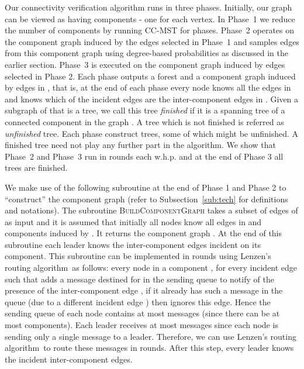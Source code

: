 \documentclass[11pt]{article}
\newcommand{\lra}{Lenzen's routing algorithm}
\begin{document}
Our connectivity verification algorithm runs in three phases. 
Initially, our graph can be viewed as having  components - one for each vertex. 
In Phase~1 we reduce the number of components by running \textsc{CC-MST} for  phases. 
Phase~2 operates on the component graph induced by the edges selected in Phase~1  and samples edges from this component graph using degree-based probabilities as discussed in the earlier section. 
Phase~3 is executed on the component graph induced by edges selected in Phase 2. 
Each phase outputs a forest  and a component graph  induced by edges in , that is, 
at the end of each phase every node knows all the edges in  and knows which of the incident edges are the inter-component edges in .  
Given a subgraph of  that is a tree, we call this tree \textit{finished} if it is a spanning tree of a connected component in the graph .
A tree which is not finished is referred as \textit{unfinished} tree. 
Each phase construct trees, some of which might be unfinished. 
A finished tree need not play any further part in the algorithm.
We show that Phase~2 and Phase~3 run in  rounds each w.h.p. and 
at the end of Phase 3 all trees are finished. 

We make use of the following subroutine at the end of Phase 1 and Phase 2 to ``construct'' the component graph 
(refer to Subsection~\ref{sub:tech} for definitions and notations). 
The subroutine \textsc{BuildComponentGraph} takes a subset of edges of  as input and it is assumed that initially all nodes know all edges in  and components induced by .  
It returns the component graph . 
At the end of this subroutine each leader knows the inter-component edges incident on its component. 
This subroutine can be implemented in  rounds using \lra~as follows:
every node  in a component , for every incident edge  such that  adds a message destined for  in the sending queue to notify  of the presence of the inter-component edge , if it already has such a message in the queue (due to a different incident edge ) then  ignores this edge.
Hence the sending queue of each node contains at most  messages (since there can be at most  components). 
Each leader receives at most  messages since each node is sending only a single message to a leader.
Therefore, we can use \lra~to route these messages in  rounds. 
After this step, every leader  knows the incident inter-component edges. 
\end{document}
